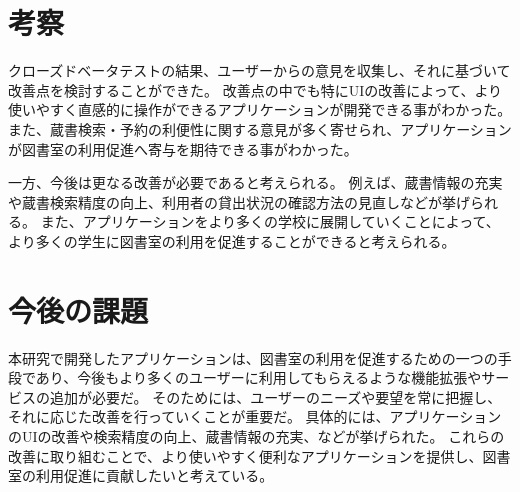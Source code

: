 \documentclass[twocolumn]{bxjsarticle}
\begin{document}
\section{考察}
クローズドベータテストの結果、ユーザーからの意見を収集し、それに基づいて改善点を検討することができた。
改善点の中でも特にUIの改善によって、より使いやすく直感的に操作ができるアプリケーションが開発できる事がわかった。
また、蔵書検索・予約の利便性に関する意見が多く寄せられ、アプリケーションが図書室の利用促進へ寄与を期待できる事がわかった。

一方、今後は更なる改善が必要であると考えられる。
例えば、蔵書情報の充実や蔵書検索精度の向上、利用者の貸出状況の確認方法の見直しなどが挙げられる。
また、アプリケーションをより多くの学校に展開していくことによって、より多くの学生に図書室の利用を促進することができると考えられる。
\section{今後の課題}
本研究で開発したアプリケーションは、図書室の利用を促進するための一つの手段であり、今後もより多くのユーザーに利用してもらえるような機能拡張やサービスの追加が必要だ。
そのためには、ユーザーのニーズや要望を常に把握し、それに応じた改善を行っていくことが重要だ。
具体的には、アプリケーションのUIの改善や検索精度の向上、蔵書情報の充実、などが挙げられた。
これらの改善に取り組むことで、より使いやすく便利なアプリケーションを提供し、図書室の利用促進に貢献したいと考えている。
\end{document}
